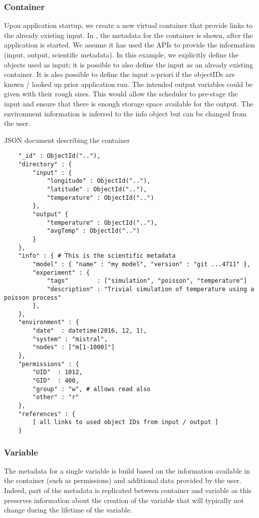 \subsubsection{Container}

Upon application startup, we create a new virtual container that provide links to the already existing input.
In , the metadata for the container is shown, after the application is started.
We assume it has used the APIs to provide the information (input, output, scientific metadata).
In this example, we explicitly define the objects used as input; it is possible to also define
the input as an already existing container.
It is also possible to define the input a-priori if the objectIDs are known / looked up prior application run.
The intended output variables could be given with their rough sizes.
This would allow the scheduler to pre-stage the input and ensure that there is enough storage space available for the output.
The environment information is inferred to the info object but can be changed from the user.

\begin{tcbcode}[label={lst:mongoContainer}]{JSON document describing the container}
	\begin{lstlisting}
	"_id" : ObjectId(".."),
	"directory" : {
		"input" : {
			"longitude" : ObjectId(".."),
			"latitude" : ObjectId(".."),
			"temperature" : ObjectId("..")
		},
		"output" {
			"temperature" : ObjectId(".."),
			"avgTemp" : ObjectId("..")
		}
	},
	"info" : { # This is the scientific metadata
		"model" : { "name" : "my model", "version" : "git ...4711" },
		"experiment" : {
			"tags"        : ["simulation", "poisson", "temperature"]
			"description" : "Trivial simulation of temperature using a poisson process"
		},
	},
	"environment" : {
		"date"  : datetime(2016, 12, 1),
		"system" : "mistral",
		"nodes" : ["m[1-1000]"]
	},
	"permissions" : {
		"UID"  : 1012,
		"GID"  : 400,
		"group" : "w", # allows read also
		"other" : "r"
	},
	"references" : {
		[ all links to used object IDs from input / output ]
	}
	\end{lstlisting}
\end{tcbcode}

\subsubsection{Variable}

The metadata for a single variable is build based on the information available in the container (such as permissions) and additional data provided by the user.
Indeed, part of the metadata is replicated between container and variable as this preserves information about the creation of the variable that will typically not change during the lifetime of the variable.

